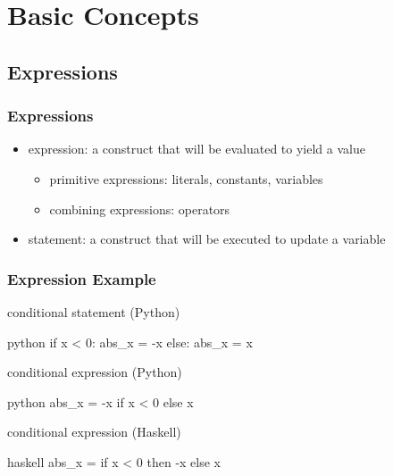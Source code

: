 \documentclass[dvipsnames]{beamer}
\theoremstyle{plain}
\begin{document}
\section{Basic Concepts}

\subsection{Expressions}

\begin{frame}
  \frametitle{Expressions}

  \medskip
  \begin{itemize}
    \item \alert{expression}: a construct that will be evaluated
      to yield a value
    \begin{itemize}
      \item primitive expressions: literals, constants, variables
      \item combining expressions: operators
    \end{itemize}

    \pause
    \medskip
    \item \alert{statement}: a construct that will be executed
      to update a variable
  \end{itemize}
\end{frame}

\begin{frame}[fragile]
  \frametitle{Expression Example}

  \begin{exampleblock}{conditional statement (Python)}
    \begin{pygments}{python}
if x < 0:
    abs_x = -x
else:
    abs_x = x
    \end{pygments}
  \end{exampleblock}

  \pause
  \begin{exampleblock}{conditional expression (Python)}
    \begin{pygments}{python}
abs_x = -x if x < 0 else x
    \end{pygments}
  \end{exampleblock}

  \pause
  \begin{exampleblock}{conditional expression (Haskell)}
    \begin{pygments}{haskell}
abs_x = if x < 0 then -x else x
    \end{pygments}
  \end{exampleblock}
\end{frame}
\end{document}
